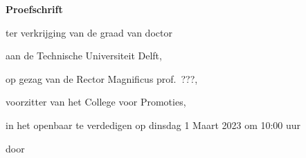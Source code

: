 \begin{titlepage}

\begin{center}

\vspace*{2\bigskipamount}

{\makeatletter
\titlestyle\singlespacing\bfseries\LARGE\@title\par
\makeatother}

{\makeatletter
\ifx\@subtitle\undefined\else
    \bigskip
    \titlefont\titleshape\Large\@subtitle
\fi
\makeatother}

\end{center}

\cleardoublepage
\thispagestyle{empty}

\begin{center}


\vspace*{2\bigskipamount}

{\makeatletter
\titlestyle\singlespacing\bfseries\LARGE\@title\par
\makeatother}

{\makeatletter
\ifx\@subtitle\undefined\else
    \bigskip
    \titlefont\titleshape\Large\@subtitle
\fi
\makeatother}


\vfill


{\Large\titlefont\bfseries Proefschrift}

\bigskip
\bigskip

ter verkrijging van de graad van doctor

aan de Technische Universiteit Delft,

op gezag van de Rector Magnificus prof.~???,

voorzitter van het College voor Promoties,

in het openbaar te verdedigen op dinsdag 1 Maart 2023 om 10:00 uur

\bigskip
\bigskip

door

\bigskip
\bigskip


\end{center}
\end{titlepage}
